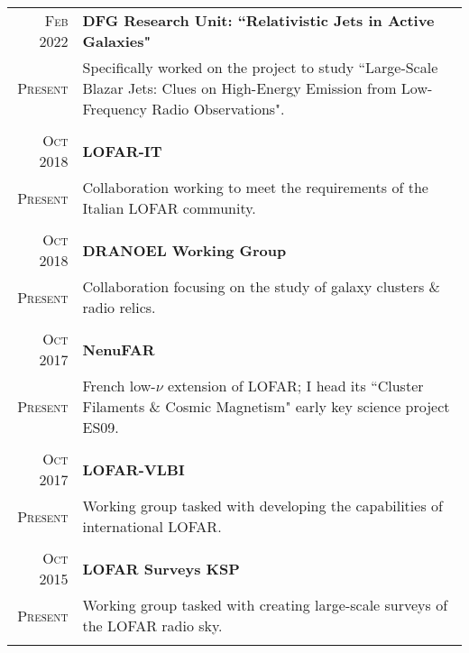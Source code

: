 \documentclass[10pt]{article} %
\begin{document}
\begin{tabular}{r|p{12.5cm}}
	
	\textsc{Feb 2022} & \textbf{DFG Research Unit: ``Relativistic Jets in Active Galaxies"}\\
	\textsc{Present}  & Specifically worked on the project to study ``Large-Scale Blazar Jets: Clues on High-Energy Emission from Low-Frequency Radio Observations".\\
	\multicolumn{2}{c}{} \\
	
	\textsc{Oct 2018} & \textbf{LOFAR-IT}\\
	\textsc{Present}  & Collaboration working to meet the requirements of the Italian LOFAR community.\\
	\multicolumn{2}{c}{} \\
	
	\textsc{Oct 2018} & \textbf{DRANOEL Working Group}\\
	\textsc{Present}  & Collaboration focusing on the study of galaxy clusters \& radio relics.\\
	\multicolumn{2}{c}{} \\

	\textsc{Oct 2017} & \textbf{NenuFAR}\\
	\textsc{Present}  & French low-$\nu$ extension of LOFAR; I head its ``Cluster Filaments \& Cosmic Magnetism" early key science project ES09.\\
	\multicolumn{2}{c}{} \\
	
	\textsc{Oct 2017} & \textbf{LOFAR-VLBI}\\
	\textsc{Present}  &  Working group tasked with developing the capabilities of international LOFAR.\\
	\multicolumn{2}{c}{} \\
	
	\textsc{Oct 2015} & \textbf{LOFAR Surveys KSP}\\
	\textsc{Present}  &  Working group tasked with creating large-scale surveys of the LOFAR radio sky.\\
	\multicolumn{2}{c}{} \\
	
\end{tabular}

\end{document}
